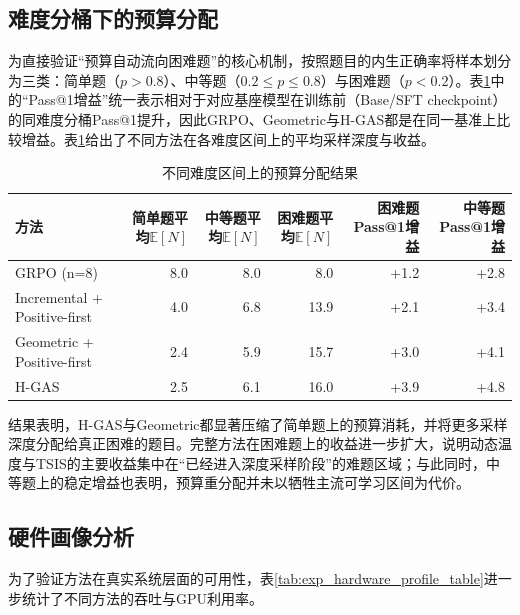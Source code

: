 \subsection{难度分桶下的预算分配}
\label{subsec:exp_bucket}

为直接验证“预算自动流向困难题”的核心机制，按照题目的内生正确率将样本划分为三类：简单题（$p>0.8$）、中等题（$0.2 \le p \le 0.8$）与困难题（$p<0.2$）。表\ref{tab:exp_bucket_table}中的“Pass@1增益”统一表示相对于对应基座模型在训练前（Base/SFT checkpoint）的同难度分桶Pass@1提升，因此GRPO、Geometric与H-GAS都是在同一基准上比较增益。表\ref{tab:exp_bucket_table}给出了不同方法在各难度区间上的平均采样深度与收益。

\begin{table}[htbp]
    \centering
    \caption{不同难度区间上的预算分配结果}\label{tab:exp_bucket_table}
    \small
    \setlength{\tabcolsep}{3.0pt}
    \renewcommand{\arraystretch}{1.15}
    \begin{tabular}{|l|r|r|r|r|r|}
    \hline
    \textbf{方法} & \textbf{简单题平均$\mathbb{E}[N]$} & \textbf{中等题平均$\mathbb{E}[N]$} & \textbf{困难题平均$\mathbb{E}[N]$} & \textbf{困难题Pass@1增益} & \textbf{中等题Pass@1增益} \\
    \hline
    GRPO (n=8)                   & 8.0 & 8.0 & 8.0  & +1.2 & +2.8 \\
    Incremental + Positive-first & 4.0 & 6.8 & 13.9 & +2.1 & +3.4 \\
    Geometric + Positive-first   & 2.4 & 5.9 & 15.7 & +3.0 & +4.1 \\
    H-GAS                        & 2.5 & 6.1 & 16.0 & +3.9 & +4.8 \\
    \hline
    \end{tabular}
\end{table}

结果表明，H-GAS与Geometric都显著压缩了简单题上的预算消耗，并将更多采样深度分配给真正困难的题目。完整方法在困难题上的收益进一步扩大，说明动态温度与TSIS的主要收益集中在“已经进入深度采样阶段”的难题区域；与此同时，中等题上的稳定增益也表明，预算重分配并未以牺牲主流可学习区间为代价。

\subsection{硬件画像分析}
\label{subsec:exp_hardware_profile}

为了验证方法在真实系统层面的可用性，表\ref{tab:exp_hardware_profile_table}进一步统计了不同方法的吞吐与GPU利用率。

